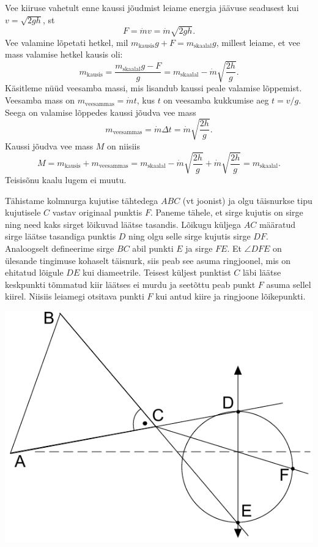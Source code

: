 \documentclass[10pt]{article}
\begin{document}
Vee kiiruse vahetult enne kaussi jõudmist leiame energia jäävuse seadusest kui $v=\sqrt{2gh}$, st
\[
F=\dot mv = \dot m\sqrt{2gh}.
\]
Vee valamine lõpetati hetkel, mil $m_{\mathrm{kausis}} g+F=m_\mathrm{skaalal}g$, millest leiame, et vee mass valamise hetkel kausis oli:
\begin{equation*}
m_{\mathrm{kausis}}=\frac{m_{\mathrm{skaalal}} g-F}{g}=m_{\mathrm{skaalal}}-\dot{m}\sqrt{\frac{2h}{g}}.
\end{equation*}
Käsitleme nüüd veesamba massi, mis lisandub kaussi peale valamise lõppemist. Veesamba mass on $m_{\mathrm{veesammas}}=\dot{m}t$, kus $t$ on veesamba kukkumise aeg $t = v / g$. Seega on valamise lõppedes kaussi jõudva vee mass
\begin{equation*}
m_{\mathrm{veesammas}}=\dot{m} \Delta t = \dot{m}\sqrt{\frac{2h}{g}}.
\end{equation*}
Kaussi jõudva vee mass $M$ on niisiis
\begin{equation*}
M=m_{\mathrm{kausis}}+m_{\mathrm{veesammas}}=m_{\mathrm{skaalal}}-\dot{m}\sqrt{\frac{2h}{g}}+\dot{m}\sqrt{\frac{2h}{g}}=m_{\mathrm{skaalal}}.
\end{equation*}
Teisisõnu kaalu lugem ei muutu.
\probend
\bigskip


\solu
Tähistame kolmnurga kujutise tähtedega $ABC$ (vt joonist) ja olgu täisnurkse tipu kujutisele $C$ vastav originaal punktis $F$. Paneme tähele, et sirge kujutis on sirge ning need kaks sirget lõikuvad läätse tasandis. Lõikugu küljega $AC$ määratud sirge läätse tasandiga punktis $D$ ning olgu selle sirge kujutis sirge $DF$. Analoogselt defineerime sirge 
$BC$ abil punkti $E$ ja sirge $FE$. Et $\angle DFE$ on ülesande tingimuse kohaselt täisnurk, siis peab see asuma ringjoonel, mis on ehitatud lõigule $DE$ kui diameetrile. Teisest küljest punktist $C$ läbi läätse keskpunkti tõmmatud kiir läätses ei murdu ja seetõttu peab punkt $F$ asuma sellel kiirel. Niisiis leiamegi otsitava punkti $F$ kui antud kiire ja ringjoone lõikepunkti.
\begin{center}
	\includegraphics[width=0.5\linewidth]{2018-lahg-08-sol.pdf}
\end{center}
\probend
\bigskip
\end{document}
